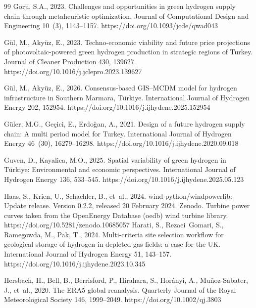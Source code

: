 \documentclass[preprint,12pt,authoryear]{elsarticle}
\begin{document}
\begin{thebibliography}{99}
Gorji, S.A., 2023. Challenges and opportunities in green hydrogen supply chain through metaheuristic optimization. Journal of Computational Design and Engineering 10~(3), 1143--1157. https://doi.org/10.1093/jcde/qwad043

G{\"u}l, M., Aky{\"u}z, E., 2023. Techno-economic viability and future price projections of photovoltaic-powered green hydrogen production in strategic regions of Turkey. Journal of Cleaner Production 430, 139627. https://doi.org/10.1016/j.jclepro.2023.139627

G{\"u}l, M., Aky{\"u}z, E., 2026. Consensus-based GIS--MCDM model for hydrogen infrastructure in Southern Marmara, T{\"u}rkiye. International Journal of Hydrogen Energy 202, 152954. https://doi.org/10.1016/j.ijhydene.2025.152954

G{\"u}ler, M.G., Ge{\c{c}}ici, E., Erdo{\u{g}}an, A., 2021. Design of a future hydrogen supply chain: A multi period model for Turkey. International Journal of Hydrogen Energy 46~(30), 16279--16298. https://doi.org/10.1016/j.ijhydene.2020.09.018

Guven, D., Kayalica, M.O., 2025. Spatial variability of green hydrogen in T{\"u}rkiye: Environmental and economic perspectives. International Journal of Hydrogen Energy 136, 533--545. https://doi.org/10.1016/j.ijhydene.2025.05.123

Haas, S., Krien, U., Schachler, B., et~al., 2024. wind-python/windpowerlib: Update release. Version 0.2.2, released 20 February 2024. Zenodo. Turbine power curves taken from the OpenEnergy Database (oedb) wind turbine library. https://doi.org/10.5281/zenodo.10685057
Harati, S., Rezaei~Gomari, S., Ramegowda, M., Pak, T., 2024. Multi-criteria site selection workflow for geological storage of hydrogen in depleted gas fields: a case for the UK. International Journal of Hydrogen Energy 51, 143--157. https://doi.org/10.1016/j.ijhydene.2023.10.345

Hersbach, H., Bell, B., Berrisford, P., Hirahara, S., Hor{\'a}nyi, A., Mu{\~n}oz-Sabater, J., et~al., 2020. The ERA5 global reanalysis. Quarterly Journal of the Royal Meteorological Society 146, 1999--2049. https://doi.org/10.1002/qj.3803


\end{thebibliography}
\end{document}
